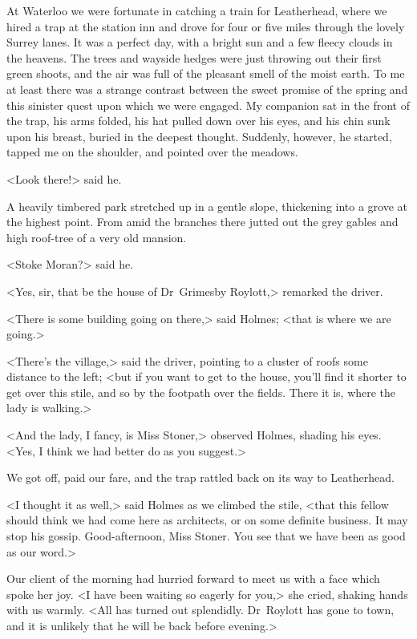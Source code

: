 At Waterloo we were fortunate in catching a train for Leatherhead, where we hired a trap at the station inn and drove for four or five miles through the lovely Surrey lanes. It was a perfect day, with a bright sun and a few fleecy clouds in the heavens. The trees and wayside hedges were just throwing out their first green shoots, and the air was full of the pleasant smell of the moist earth. To me at least there was a strange contrast between the sweet promise of the spring and this sinister quest upon which we were engaged. My companion sat in the front of the trap, his arms folded, his hat pulled down over his eyes, and his chin sunk upon his breast, buried in the deepest thought. Suddenly, however, he started, tapped me on the shoulder, and pointed over the meadows.

<Look there!> said he.

A heavily timbered park stretched up in a gentle slope, thickening into a grove at the highest point. From amid the branches there jutted out the grey gables and high roof-tree of a very old mansion.

<Stoke Moran?> said he.

<Yes, sir, that be the house of Dr~Grimesby Roylott,> remarked the driver.

<There is some building going on there,> said Holmes; <that is where we are going.>

<There's the village,> said the driver, pointing to a cluster of roofs some distance to the left; <but if you want to get to the house, you'll find it shorter to get over this stile, and so by the footpath over the fields. There it is, where the lady is walking.>

<And the lady, I fancy, is Miss Stoner,> observed Holmes, shading his eyes. <Yes, I think we had better do as you suggest.>

We got off, paid our fare, and the trap rattled back on its way to Leatherhead.

<I thought it as well,> said Holmes as we climbed the stile, <that this fellow should think we had come here as architects, or on some definite business. It may stop his gossip. Good-afternoon, Miss Stoner. You see that we have been as good as our word.>

Our client of the morning had hurried forward to meet us with a face which spoke her joy. <I have been waiting so eagerly for you,> she cried, shaking hands with us warmly. <All has turned out splendidly. Dr~Roylott has gone to town, and it is unlikely that he will be back before evening.>

